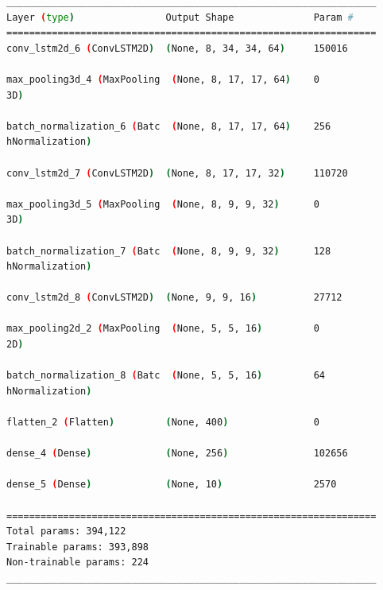 \begin{lstlisting}[language=Bash,caption={Overview of layers in Convolutional LTSM network.},label={lst:conv_lstm_layers},numbers=none,float=htb]
_________________________________________________________________
Layer (type)                Output Shape              Param #   
=================================================================
conv_lstm2d_6 (ConvLSTM2D)  (None, 8, 34, 34, 64)     150016    
                                                                
max_pooling3d_4 (MaxPooling  (None, 8, 17, 17, 64)    0         
3D)                                                             
                                                                
batch_normalization_6 (Batc  (None, 8, 17, 17, 64)    256       
hNormalization)                                                 
                                                                
conv_lstm2d_7 (ConvLSTM2D)  (None, 8, 17, 17, 32)     110720    
                                                                
max_pooling3d_5 (MaxPooling  (None, 8, 9, 9, 32)      0         
3D)                                                             
                                                                
batch_normalization_7 (Batc  (None, 8, 9, 9, 32)      128       
hNormalization)                                                 
                                                                
conv_lstm2d_8 (ConvLSTM2D)  (None, 9, 9, 16)          27712     
                                                                
max_pooling2d_2 (MaxPooling  (None, 5, 5, 16)         0         
2D)                                                             
                                                                
batch_normalization_8 (Batc  (None, 5, 5, 16)         64        
hNormalization)                                                 
                                                                
flatten_2 (Flatten)         (None, 400)               0         
                                                                
dense_4 (Dense)             (None, 256)               102656    
                                                                
dense_5 (Dense)             (None, 10)                2570      
                                                                
=================================================================
Total params: 394,122
Trainable params: 393,898
Non-trainable params: 224
_________________________________________________________________
\end{lstlisting}

